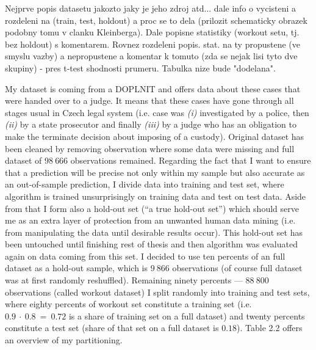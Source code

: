 \documentclass[12pt, twoside,openany]{book} %
\begin{document}
Nejprve popis datasetu jakozto jaky je jeho zdroj atd... dale info o vycisteni a  rozdeleni na (train, test, holdout) a proc se to dela (prilozit schematicky obrazek podobny tomu v clanku Kleinberga). Dale popisne statistiky (workout setu, tj. bez holdout) s komentarem. Rovnez rozdeleni popis. stat. na ty propustene (ve smyslu vazby) a nepropustene a komentar k tomuto (zda se nejak lisi tyto dve skupiny) -  pres t-test shodnosti prumeru. Tabulka nize bude "dodelana". 


My dataset is coming from a \newline
 DOPLNIT \newline
and offers data about these cases that were handed over to a judge. It means that these cases have gone through all stages usual in Czech legal system (i.e. case was \textit{(i)} investigated by a police, then \textit{(ii)} by a state prosecutor and finally \textit{(iii)} by a judge who has an obligation to make the terminate decision about imposing of a custody).\newline
Original dataset has been cleaned by removing observation where some data were missing and full dataset of $98~666$ observations remained. Regarding the fact that I want to ensure that a prediction will be precise not only within my sample but also accurate as an out-of-sample prediction, I divide data into training and test set, where algorithm is trained unsurprisingly on training data and test on test data. Aside from that I form also a hold-out set (“a true hold-out set”) which should serve me as an extra layer of protection from an unwanted human data mining (i.e. from manipulating the data until desirable results occur). This hold-out set has been untouched until finishing rest of thesis and then algorithm was evaluated again on data coming from this set. I decided to use ten percents of an full dataset as a hold-out sample, which is $9~866$ observations (of course full dataset was at first randomly reshuffled). Remaining ninety percents — $88~800$ observations (called workout dataset) I split randomly into training and test sets, where eighty percents of workout set constitute a training set (i.e. $0.9~\cdot~0.8~=~0.72$ is a share of training set on a full dataset) and twenty percents constitute a test set (share of that set on a full dataset is $0.18$). Table 2.2 offers an overview of my partitioning.\newline
\end{document}
